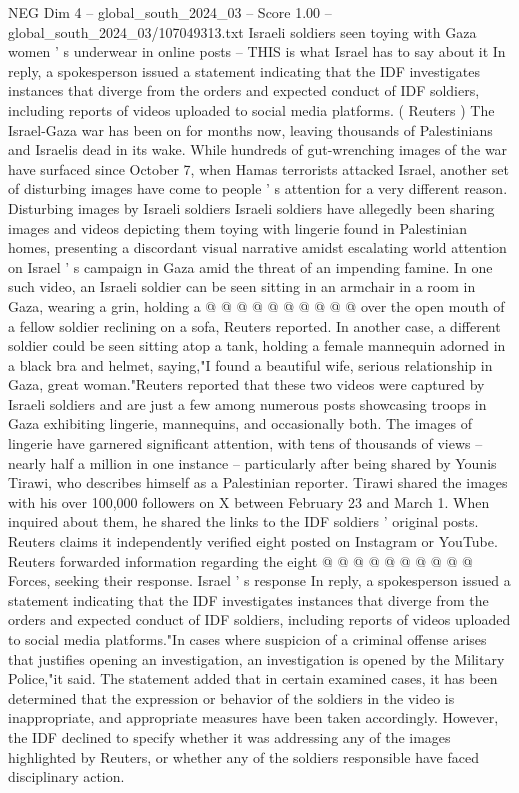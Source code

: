 \begin{textsample}{NEG Dim 4 – global\_south\_2024\_03 – Score 1.00 – global\_south\_2024\_03/107049313.txt}  \label{ex:f4_neg_354}
Israeli soldiers seen toying with Gaza women ' s underwear in online posts -- THIS is what Israel has to say about it In reply, a spokesperson issued a statement indicating that the IDF investigates instances that diverge from the orders and expected conduct of IDF soldiers, including reports of videos uploaded to social media platforms. ( Reuters ) The Israel-Gaza war has been on for months now, leaving thousands of Palestinians and Israelis dead in its wake.
While hundreds of gut-wrenching images of the war have surfaced since October 7, when Hamas terrorists attacked Israel, another set of disturbing images have come to people ' s attention for a very different reason.
Disturbing images by Israeli soldiers Israeli soldiers have allegedly been sharing images and videos depicting them toying with lingerie found in Palestinian homes, presenting a discordant visual narrative amidst escalating world attention on Israel ' s campaign in Gaza amid the threat of an impending famine.
In one such video, an Israeli soldier can be seen sitting in an armchair in a room in Gaza, wearing a grin, holding a @ @ @ @ @ @ @ @ @ @ over the open mouth of a fellow soldier reclining on a sofa, Reuters reported.
In another case, a different soldier could be seen sitting atop a tank, holding a female mannequin adorned in a black bra and helmet, saying,"I found a beautiful wife, serious relationship in Gaza, great woman."Reuters reported that these two videos were captured by Israeli soldiers and are just a few among numerous posts showcasing troops in Gaza exhibiting lingerie, mannequins, and occasionally both.
The images of lingerie have garnered significant attention, with tens of thousands of views -- nearly half a million in one instance -- particularly after being shared by Younis Tirawi, who describes himself as a Palestinian reporter.
Tirawi shared the images with his over 100,000 followers on X between February 23 and March 1.
When inquired about them, he shared the links to the IDF soldiers ' original posts.
Reuters claims it independently verified eight posted on Instagram or YouTube.
Reuters forwarded information regarding the eight @ @ @ @ @ @ @ @ @ @ Forces, seeking their response.
Israel ' s response In reply, a spokesperson issued a statement indicating that the IDF investigates instances that diverge from the orders and expected conduct of IDF soldiers, including reports of videos uploaded to social media platforms."In cases where suspicion of a criminal offense arises that justifies opening an investigation, an investigation is opened by the Military Police,"it said.
The statement added that in certain examined cases, it has been determined that the expression or behavior of the soldiers in the video is inappropriate, and appropriate measures have been taken accordingly.
However, the IDF declined to specify whether it was addressing any of the images highlighted by Reuters, or whether any of the soldiers responsible have faced disciplinary action.

\end{textsample}
